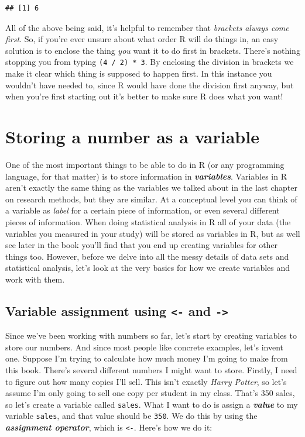 \documentclass[
]{book}
\begin{document}
\begin{verbatim}
## [1] 6
\end{verbatim}

All of the above being said, it's helpful to remember that \emph{brackets always come first}. So, if you're ever unsure about what order R will do things in, an easy solution is to enclose the thing \emph{you} want it to do first in brackets. There's nothing stopping you from typing \texttt{(4\ /\ 2)\ *\ 3}. By enclosing the division in brackets we make it clear which thing is supposed to happen first. In this instance you wouldn't have needed to, since R would have done the division first anyway, but when you're first starting out it's better to make sure R does what you want!

\hypertarget{assign}{%
\section{Storing a number as a variable}\label{assign}}

One of the most important things to be able to do in R (or any programming language, for that matter) is to store information in \textbf{\emph{variables}}. Variables in R aren't exactly the same thing as the variables we talked about in the last chapter on research methods, but they are similar. At a conceptual level you can think of a variable as \emph{label} for a certain piece of information, or even several different pieces of information. When doing statistical analysis in R all of your data (the variables you measured in your study) will be stored as variables in R, but as well see later in the book you'll find that you end up creating variables for other things too. However, before we delve into all the messy details of data sets and statistical analysis, let's look at the very basics for how we create variables and work with them.

\hypertarget{variable-assignment-using---and--}{%
\subsection{\texorpdfstring{Variable assignment using \texttt{\textless{}-} and \texttt{-\textgreater{}}}{Variable assignment using \textless- and -\textgreater{}}}\label{variable-assignment-using---and--}}

Since we've been working with numbers so far, let's start by creating variables to store our numbers. And since most people like concrete examples, let's invent one. Suppose I'm trying to calculate how much money I'm going to make from this book. There's several different numbers I might want to store. Firstly, I need to figure out how many copies I'll sell. This isn't exactly \emph{Harry Potter}, so let's assume I'm only going to sell one copy per student in my class. That's 350 sales, so let's create a variable called \texttt{sales}. What I want to do is assign a \textbf{\emph{value}} to my variable \texttt{sales}, and that value should be \texttt{350}. We do this by using the \textbf{\emph{assignment operator}}, which is \texttt{\textless{}-}. Here's how we do it:
\end{document}
